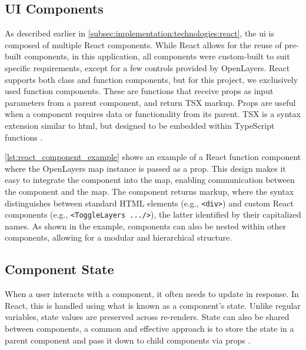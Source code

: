 \subsection{UI Components}

As described earlier in \autoref{subsec:implementation:technologies:react}, the \acrshort{ui} is composed of multiple React components. While React allows for the reuse of pre-built components, in this application, all components were custom-built to suit specific requirements, except for a few controls provided by OpenLayers. React supports both class and function components, but for this project, we exclusively used function components. These are functions that receive props as input parameters from a parent component, and return TSX markup. Props are useful when a component requires data or functionality from its parent. TSX is a syntax extension similar to \acrshort{html}, but designed to be embedded within TypeScript functions \cite{react_component}.

\autoref{lst:react_component_example} shows an example of a React function component where the OpenLayers map instance is passed as a prop. This design makes it easy to integrate the component into the map, enabling communication between the component and the map. The component returns markup, where the syntax distinguishes between standard HTML elements (e.g., \texttt{<div>}) and custom React components (e.g., \texttt{<ToggleLayers .../>}), the latter identified by their capitalized names. As shown in the example, components can also be nested within other components, allowing for a modular and hierarchical structure.

\begin{figure}[h]

\end{figure}


\subsection{Component State} %

When a user interacts with a component, it often needs to update in response. In React, this is handled using what is known as a component's state. Unlike regular variables, state values are preserved across re-renders. State can also be shared between components, a common and effective approach is to store the state in a parent component and pass it down to child components via props \cite{react_state}.

